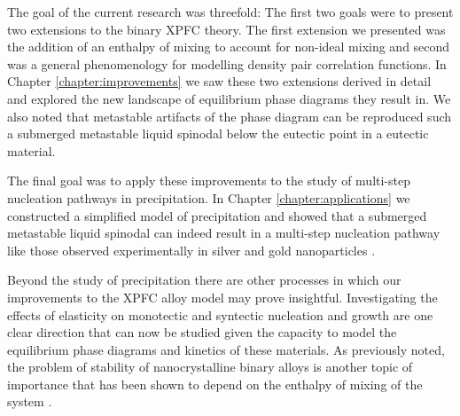 \label{chapter:conclusion}

The goal of the current research was threefold: The first two goals were to
present two extensions to the binary XPFC theory. The first extension we
presented was the addition of an enthalpy of mixing to account for non-ideal
mixing and second was a general phenomenology for modelling density pair
correlation functions. In Chapter \ref{chapter:improvements} we saw these two
extensions derived in detail and explored the new landscape of equilibrium
phase diagrams they result in. We also noted that metastable artifacts of the
phase diagram can be reproduced such a submerged metastable liquid spinodal
below the eutectic point in a eutectic material. 

The final goal was to apply these improvements to the study of multi-step
nucleation pathways in precipitation. In Chapter \ref{chapter:applications} we
constructed a simplified model of precipitation and showed that a submerged
metastable liquid spinodal can indeed result in a multi-step nucleation pathway
like those observed experimentally in silver and gold nanoparticles
\cite{LOH17}. 

Beyond the study of precipitation there are other processes in which our
improvements to the XPFC alloy model may prove insightful. Investigating the
effects of elasticity on monotectic and  syntectic nucleation and growth are
one clear direction that can now be studied given the capacity to model the
equilibrium phase diagrams and kinetics of these materials. As previously
noted, the problem of stability of nanocrystalline binary alloys is another
topic of importance that has  been shown to depend on the enthalpy of mixing of
the system \cite{MURDOCH13}.
